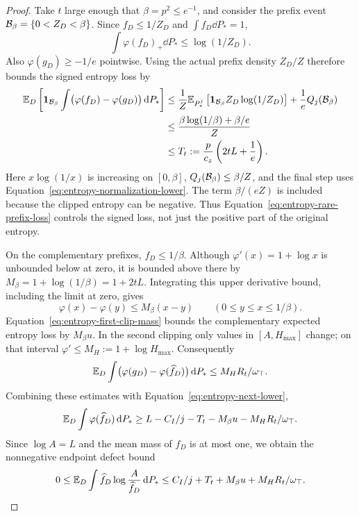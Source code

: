 \begin{proof}
Take $t$ large enough that $\beta=p^2\le e^{-1}$, and consider the
prefix event $\mathcal B_\beta=\{0<Z_D<\beta\}$.  Since
$f_D\le1/Z_D$ and $\int f_D\dd P_*=1$,
\[
 \int\varphi(f_D)_+\dd P_*\le\log(1/Z_D).
\]
Also $\varphi(g_D)\ge-1/e$ pointwise.  Using the actual prefix density
$Z_D/Z$ therefore bounds the signed entropy loss by
\begin{align}
 \mathbb E_D\left[\mathbf 1_{\mathcal B_\beta}
       \int\bigl(\varphi(f_D)-\varphi(g_D)\bigr)\,\mathrm d P_*\right]
 &\le\frac1Z\mathbb E_{P_*^j}
         \left[\mathbf 1_{\mathcal B_\beta}Z_D\log(1/Z_D)\right]
          +\frac1e Q_j(\mathcal B_\beta)
 \notag\\
 &\le\frac{\beta\log(1/\beta)+\beta/e}{Z}
 \notag\\
 &\le T_t:=\frac p{c_z}\left(2tL+\frac1e\right).
 \label{eq:entropy-rare-prefix-loss}
\end{align}
Here $x\log(1/x)$ is increasing on $[0,\beta]$,
$Q_j(\mathcal B_\beta)\le\beta/Z$, and the final step uses
Equation~\ref{eq:entropy-normalization-lower}.  The term $\beta/(eZ)$
is included because the clipped entropy can be negative.  Thus
Equation~\ref{eq:entropy-rare-prefix-loss} controls the signed loss,
not just the positive part of the original entropy.

On the complementary prefixes, $f_D\le1/\beta$.  Although
$\varphi'(x)=1+\log x$ is unbounded below at zero, it is bounded above
there by $M_\beta=1+\log(1/\beta)=1+2tL$.  Integrating this upper
derivative bound, including the limit at zero, gives
\[
 \varphi(x)-\varphi(y)\le M_\beta(x-y)
 \qquad(0\le y\le x\le1/\beta).
\]
Equation~\ref{eq:entropy-first-clip-mass} bounds the complementary
expected entropy loss by $M_\beta u$.  In the second clipping only values
in $[A,H_{\max}]$ change; on that interval
$\varphi'\le M_H:=1+\log H_{\max}$.  Consequently
\[
 \mathbb E_D\int\bigl(\varphi(g_D)-\varphi(\widehat f_D)\bigr)\,\mathrm d P_*
 \le M_H R_t/\omega_\top.
\]
Combining these estimates with Equation~\ref{eq:entropy-next-lower},
\[
 \mathbb E_D\int\varphi(\widehat f_D)\,\mathrm d P_*
 \ge L-C_I/j-T_t-M_\beta u-M_H R_t/\omega_\top.
\]
Since $\log A=L$ and the mean mass of $\widehat f_D$ is at most one,
we obtain the nonnegative endpoint defect bound
\begin{equation}
 \label{eq:entropy-endpoint-defect}
 0\le\mathbb E_D\int\widehat f_D\log\frac A{\widehat f_D}\,\mathrm d P_*
 \le C_I/j+T_t+M_\beta u+M_H R_t/\omega_\top.
\end{equation}


\end{proof}
